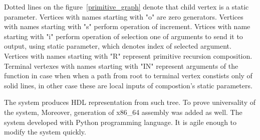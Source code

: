 Dotted lines on the figure~\ref{primitive_graph} denote that child vertex is a static parameter. Vertices with names starting with "o" are zero generators. Vertices with names starting with "s" perform operation of increment. Vrtices with name starting with "i" perform operation of selection one of arguments to send it to output, using static parameter, which denotes index of selected argument. Vertices with names starting with "R" represent primitive recursion composition. Terminal vertexes with names starting with "IN" represent arguments of the function in case when when a path from root to terminal vertex constists only of solid lines, in other case these are local inputs of compostion's static parameters.

The system produces HDL representation from such tree. To prove universality of the system, Moreover, generation of x86\_64 assembly was added as well. The system developed with Python programming language. It is agile enough to modify the system quickly.
